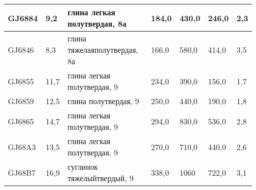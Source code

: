 \begin{table}[h]
\begin{threeparttable}
\begin{tabular}{|p{1.7cm}|p{1.7cm}|p{5cm}|p{1.4cm}|p{1.4cm}|p{1.4cm}|p{1.4cm}|}
GJ6884 & 9,2            & глина легкая   полутвердая, 8а                  & 184,0 & 430,0 & 246,0 & 2,3 \\ \hline
GJ6846 & 8,3            & глина тяжелая\linebreak полутвердая, 8а         & 166,0 & 580,0 & 414,0 & 3,5 \\ \hline
GJ6855 & 11,7           & глина легкая   полутвердая, 9                  & 234,0 & 390,0 & 156,0 & 1,7 \\ \hline
GJ6859 & 12,5           & глина полутвердая, 9                           & 250,0 & 440,0 & 190,0 & 1,8 \\ \hline
GJ6865 & 14,7           & глина легкая   полутвердая, 9                  & 294,0 & 830,0 & 536,0 & 2,8 \\ \hline
GJ68A3 & 13,5           & глина легкая   полутвердая, 9                  & 270,0 & 710,0 & 440,0 & 2,6 \\ \hline
GJ68B7 & 16,9           & суглинок тяжелый\linebreak   твердый, 9        & 338,0 & 1060  & 722,0 & 3,1 \\ \hline
  \end{tabular}
\end{threeparttable}
  \end{table}

